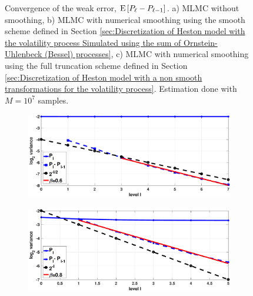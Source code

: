 \begin{figure}[htb]
\begin{subfigure}{0.5\textwidth}
		\caption{}
		\label{fig:weak_rate_hest_digital_smoothing_FT}
	\end{subfigure}
	\caption{Convergence of the weak error,  $\mathrm{E}\left[P_{\ell}-P_{\ell-1}\right]$. a) MLMC without smoothing, b) MLMC with numerical smoothing using the smooth scheme defined in Section \ref{sec:Discretization of Heston model with the volatility process Simulated using the sum of  Ornstein-Uhlenbeck (Bessel) processes}, c) MLMC with numerical smoothing using the full truncation scheme defined in Section \ref{sec:Discretization of Heston model with a non smooth transformations for the volatility process}. Estimation done with $M=10^7$ samples.}
	\label{fig:weak_rate_hest_digital}	
\end{figure}
\FloatBarrier

\begin{figure}[htb]
	\centering %
	\begin{subfigure}{0.5\textwidth}
		\includegraphics[width=\linewidth]{./figures/MLMC_binary_Heston_opt/without_smoothing/digital_option_set1_L_0_1_steps_L_6_2_N_10_7/digital_option_set1_L_0_1_steps_L_6_2_N_10_7_strong}
		\caption{}
		\label{fig:strong_rate_hest_digital_non_smoothing_FT}
	\end{subfigure}\hfil %
	\begin{subfigure}{0.5\textwidth}
		\includegraphics[width=\linewidth]{./figures/MLMC_binary_Heston_opt/with_smoothing/OU/digital_option_set1_L_0_2_steps_L_5_N_10_7_beta_128/digital_option_set1_L_0_2_steps_L_5_N_10_7_strong}

\end{subfigure}
\end{figure}
